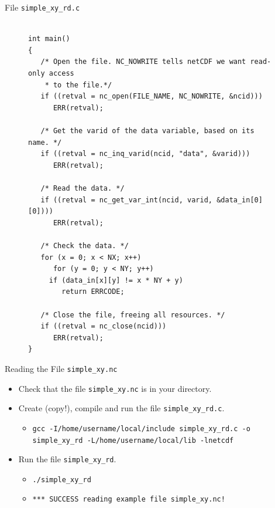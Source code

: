 \documentclass[compress,11pt,xcolor=svgnames,aspectratio=169]{beamer}
\begin{document}
\begin{frame}[fragile]{File \texttt{simple\_xy\_rd.c}}

\begin{figure}
\centering
\begin{varwidth}{\linewidth}
{\tiny

\begin{verbatim}

int main()
{
   /* Open the file. NC_NOWRITE tells netCDF we want read-only access
    * to the file.*/
   if ((retval = nc_open(FILE_NAME, NC_NOWRITE, &ncid)))
      ERR(retval);

   /* Get the varid of the data variable, based on its name. */
   if ((retval = nc_inq_varid(ncid, "data", &varid)))
      ERR(retval);

   /* Read the data. */
   if ((retval = nc_get_var_int(ncid, varid, &data_in[0][0])))
      ERR(retval);

   /* Check the data. */
   for (x = 0; x < NX; x++)
      for (y = 0; y < NY; y++)
	 if (data_in[x][y] != x * NY + y)
	    return ERRCODE;

   /* Close the file, freeing all resources. */
   if ((retval = nc_close(ncid)))
      ERR(retval);
}

\end{verbatim}

}
\end{varwidth}
\end{figure}

\end{frame}

\begin{frame}[fragile]{Reading the File \texttt{simple\_xy.nc}}

\begin{itemize}
\setlength\itemsep{0.6cm}

  \item Check that the file \verb|simple_xy.nc| is in your directory.

  \item Create (copy!), compile and run the file \verb|simple_xy_rd.c|.\\[0.4cm]

        \begin{itemize}
          \item {\tiny  \verb|gcc -I/home/username/local/include simple_xy_rd.c -o simple_xy_rd -L/home/username/local/lib -lnetcdf| }\\[0.4cm]
        \end{itemize}

  \item Run the file \verb|simple_xy_rd|.

        \begin{itemize}
          \item {\tiny  \verb|./simple_xy_rd|}
          \item {\tiny  \verb|*** SUCCESS reading example file simple_xy.nc!|}
        \end{itemize}

\end{itemize}

\end{frame}
\end{document}
